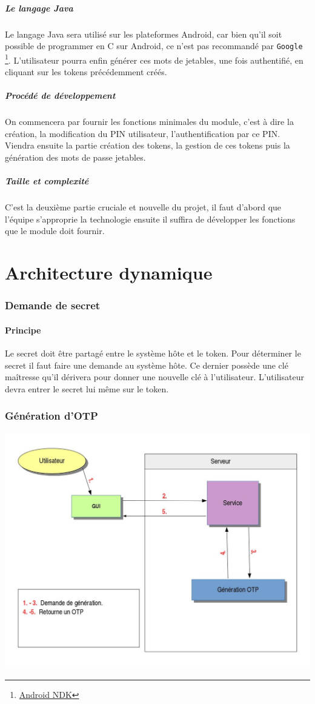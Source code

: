 \documentclass{"../../res/univ-projet"}
\begin{document}
\subsubsection{Le langage Java}
    Le langage Java sera utilisé sur les plateformes Android, car bien qu'il soit possible de programmer en C
    sur Android, ce n'est pas recommandé par \verb?Google?
    \footnote{\href{https://developer.android.com/tools/sdk/ndk/index.html}{Android NDK}}.
L’utilisateur pourra enfin générer ces mots de jetables, une fois authentifié, en cliquant sur les tokens précédemment créés.
	\subsubsection{Procédé de développement}
        On commencera par fournir les fonctions minimales du module, c'est à dire la création, la modification  du PIN utilisateur, l'authentification par ce PIN. Viendra ensuite la partie création des tokens, la gestion de ces tokens puis la génération des mots de passe  jetables.
        \subsubsection{Taille et complexité}
        C'est la deuxième partie cruciale et nouvelle du projet, il faut d'abord que l'équipe s'approprie la technologie ensuite il suffira de développer les fonctions que le module doit fournir.
\part*{Architecture dynamique}

\section{Demande de secret}
\subsection{Principe}
Le secret doit être partagé entre le système hôte et le token. Pour déterminer
le secret il faut faire une demande au système hôte. Ce dernier possède une clé
maîtresse qu'il dérivera pour donner une nouvelle clé à l'utilisateur. L'utilisateur
devra entrer le secret lui même sur le token.

\section{Génération d'OTP}
\includegraphics[width=\textwidth]{../graphics/generation.jpg}
\end{document}
